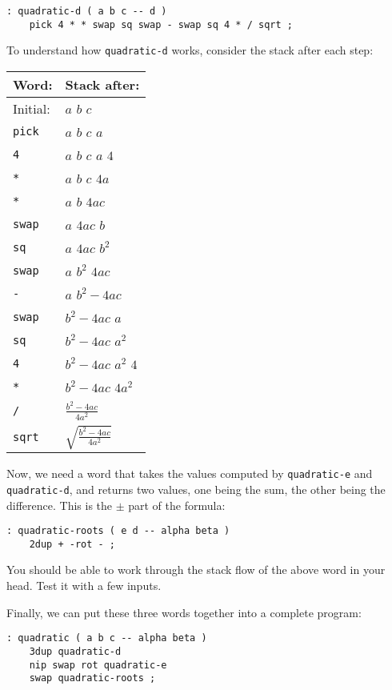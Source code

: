 \documentclass[english]{book}
\begin{document}
\begin{verbatim}
: quadratic-d ( a b c -- d )
    pick 4 * * swap sq swap - swap sq 4 * / sqrt ;
\end{verbatim}

To understand how \texttt{quadratic-d} works, consider the stack after each step:

\begin{tabular}{|l|l|}
\hline
Word:&Stack after:\\
\hline
Initial:&$a$ $b$ $c$\\
\hline
\texttt{pick}&$a$ $b$ $c$ $a$\\
\hline
\texttt{4}&$a$ $b$ $c$ $a$ $4$\\
\hline
\texttt{*}&$a$ $b$ $c$ $4a$\\
\hline
\texttt{*}&$a$ $b$ $4ac$\\
\hline
\texttt{swap}&$a$ $4ac$ $b$\\
\hline
\texttt{sq}&$a$ $4ac$ $b^2$\\
\hline
\texttt{swap}&$a$ $b^2$ $4ac$\\
\hline
\texttt{-}&$a$ $b^2-4ac$\\
\hline
\texttt{swap}&$b^2-4ac$ $a$\\
\hline
\texttt{sq}&$b^2-4ac$ $a^2$\\
\hline
\texttt{4}&$b^2-4ac$ $a^2$ $4$\\
\hline
\texttt{*}&$b^2-4ac$ $4a^2$\\
\hline
\texttt{/}&$\frac{b^2-4ac}{4a^2}$\\
\hline
\texttt{sqrt}&$\sqrt{\frac{b^2-4ac}{4a^2}}$\\
\hline
\end{tabular}

Now, we need a word that takes the values computed by \texttt{quadratic-e} and \texttt{quadratic-d}, and returns two values, one being the sum, the other being the difference. This is the $\pm$ part of the formula:

\begin{verbatim}
: quadratic-roots ( e d -- alpha beta )
    2dup + -rot - ;
\end{verbatim}

You should be able to work through the stack flow of the above word in your head. Test it with a few inputs.

Finally, we can put these three words together into a complete program:

\begin{verbatim}
: quadratic ( a b c -- alpha beta )
    3dup quadratic-d
    nip swap rot quadratic-e
    swap quadratic-roots ;
\end{verbatim}
\end{document}
